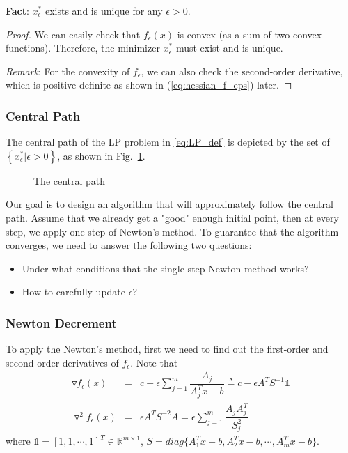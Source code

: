 \noindent\textbf{Fact}: $x^*_\epsilon$ exists and is unique for any $\epsilon>0$.
\begin{proof}
We can easily check that $f_\epsilon(x)$ is convex (as a sum of two convex functions). Therefore, the minimizer $x^*_\epsilon$ must exist and is unique.

\textit{Remark}: For the convexity of $f_\epsilon$, we can also check the second-order derivative, which is positive definite as shown in (\ref{eq:hessian_f_eps}) later.
\end{proof}

\subsubsection{Central Path}
The central path of the LP problem in \ref{eq:LP_def} is depicted by the set of $\left\{x^*_\epsilon|\epsilon>0\right\}$, as shown in Fig.~\ref{fig:central_path}.
\begin{figure}[h!]
\centering
{}
\caption{The central path\label{fig:central_path}}
\end{figure}

Our goal is to design an algorithm that will approximately follow the central path. Assume that we already get a "good" enough initial point, then at every step, we apply one step of Newton's method. To guarantee that the algorithm converges, we need to answer the following two questions:
\begin{itemize}
\item Under what conditions that the single-step Newton method works?
\item How to carefully update $\epsilon$?
\end{itemize}

\subsubsection{Newton Decrement}
To apply the Newton's method, first we need to find out the first-order and second-order derivatives of $f_\epsilon$. Note that
\begin{eqnarray}
\triangledown f_\epsilon(x)&=&c-\epsilon \sum_{j=1}^m \dfrac{A_j}{A^T_j x-b}\triangleq c-\epsilon A^T S^{-1}\mathbb{1}\label{eq:grad_f_eps}\\
\triangledown^2f_\epsilon(x)&=&\epsilon A^TS^{-2}A=\epsilon \sum_{j=1}^m\dfrac{A_j A_j^T}{S_j^2}\label{eq:hessian_f_eps}
\end{eqnarray}
where $\mathbb{1}=[1,1,\cdots,1]^T\in\mathbb{R}^{m\times1}$, $S=diag\{A^T_1 x-b, A^T_2 x-b, \cdots, A^T_m x-b\}$.

